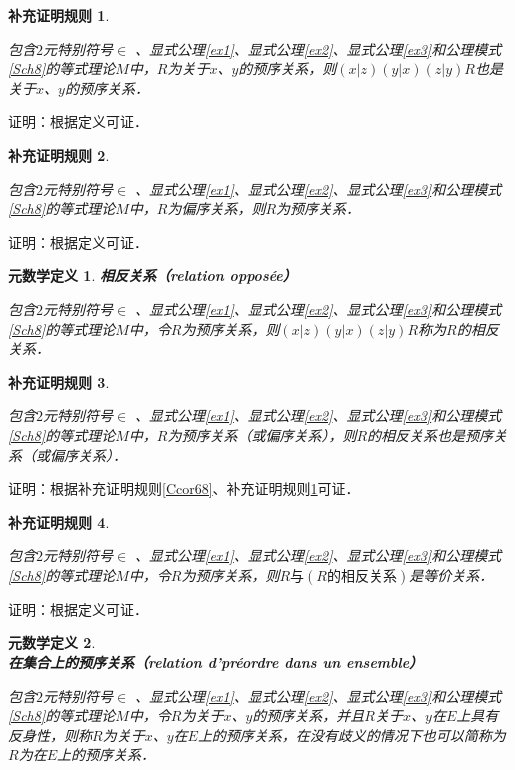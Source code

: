 \documentclass[12pt, a4paper, oneside]{book}
\newtheorem{metadef}{元数学定义}
\newtheorem{Ccor}{补充证明规则}
\begin{document}
			\begin{Ccor}\label{Ccor72}
				\hfill\par
				包含$2$元特别符号$\in$ 、显式公理\ref{ex1}、显式公理\ref{ex2}、显式公理\ref{ex3}和公理模式\ref{Sch8}的等式理论$M$中，$R$为关于$x$、$y$的预序关系，则$(x|z)(y|x)(z|y)R$也是关于$x$、$y$的预序关系．
			\end{Ccor}
			证明：根据定义可证．
			
			\begin{Ccor}\label{Ccor73}
				\hfill\par
				包含$2$元特别符号$\in$ 、显式公理\ref{ex1}、显式公理\ref{ex2}、显式公理\ref{ex3}和公理模式\ref{Sch8}的等式理论$M$中，$R$为偏序关系，则$R$为预序关系．
			\end{Ccor}
			证明：根据定义可证．
			
			\begin{metadef}
				\textbf{相反关系（relation opposée）}
				\par
				包含$2$元特别符号$\in$ 、显式公理\ref{ex1}、显式公理\ref{ex2}、显式公理\ref{ex3}和公理模式\ref{Sch8}的等式理论$M$中，令$R$为预序关系，则$(x|z)(y|x)(z|y)R$称为$R$的相反关系．
			\end{metadef}
			
			\begin{Ccor}\label{Ccor74}
				\hfill\par
				包含$2$元特别符号$\in$ 、显式公理\ref{ex1}、显式公理\ref{ex2}、显式公理\ref{ex3}和公理模式\ref{Sch8}的等式理论$M$中，$R$为预序关系（或偏序关系），则$R$的相反关系也是预序关系（或偏序关系）．
			\end{Ccor}
			证明：根据补充证明规则\ref{Ccor68}、补充证明规则\ref{Ccor72}可证．
						
			\begin{Ccor}\label{Ccor75}
				\hfill\par
				包含$2$元特别符号$\in$ 、显式公理\ref{ex1}、显式公理\ref{ex2}、显式公理\ref{ex3}和公理模式\ref{Sch8}的等式理论$M$中，令$R$为预序关系，则$R\text{与}(R\text{的相反关系})$是等价关系．
			\end{Ccor}
			证明：根据定义可证．
						
			\begin{metadef}
				\textbf{在集合上的预序关系（relation d'préordre dans un ensemble）}
				\par
				包含$2$元特别符号$\in$ 、显式公理\ref{ex1}、显式公理\ref{ex2}、显式公理\ref{ex3}和公理模式\ref{Sch8}的等式理论$M$中，令$R$为关于$x$、$y$的预序关系，并且$R$关于$x$、$y$在$E$上具有反身性，则称$R$为关于$x$、$y$在$E$上的预序关系，在没有歧义的情况下也可以简称为$R$为在$E$上的预序关系．
			\end{metadef}
			
\end{document}
